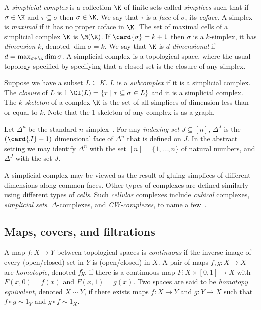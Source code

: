 A \emph{simplicial complex} is a collection $\K$ of finite sets called
\emph{simplices} such that if $\sigma \in \K$ and $\tau \subseteq \sigma$ then 
$\sigma \in \K$. We say that $\tau$ is a \emph{face} of $\sigma$, its \emph{coface}. A simplex
is \emph{maximal} if it has no proper coface in $\K$. The set of maximal cells of a 
simplicial complex $\K$ is $\M(\K)$. If $\card{\sigma} = k+1$
then $\sigma$ is a $k$-simplex, it has \emph{dimension} $k$, denoted 
$\dim{\sigma} = k$. We say that $\K$ is \emph{$d$-dimensional} if 
$d = \max_{\sigma \in \K} \dim{\sigma}$. A simplicial complex is a topological space, where the 
usual topology specified by specifying that a closed set is the closure of any simplex.

Suppose we have a subset $L \subseteq K$.  $L$ is a \emph{subcomplex}
if it is a simplicial complex. The \emph{closure} of $L$ is 1
$\Cl(L) = \{ \tau \mid \tau \subseteq \sigma \in L\}$ and it is a simplicial complex. The 
\emph{$k$-skeleton} of a complex $\K$ is the set of all simplices
of dimension less than or equal to $k$. Note that the 1-skeleton of
any complex is as a graph.

Let $\Delta^n$ be the standard $n$-simplex~\cite{hatcher}. For any
\emph{indexing set} $J \subseteq [n]$, $\Delta^J$ is the $(\card{J}-1)$ 
dimensional face of $\Delta^n$  that is defined on $J$. In the abstract setting we may
identify $\Delta^n$ with the set $[n] = \{1, \ldots, n\}$ of natural numbers, and $\Delta^J$ with the set $J$.

A simplicial complex may be viewed as the result of gluing simplices of 
different dimensions along common faces. Other types of complexes are defined 
similarly using different types of \emph{cells}. Such \emph{cellular} complexes include \emph{cubical} complexes, \emph{simplicial sets}. $\Delta$-complexes, and \emph{CW-complexes}, 
to name a few~\cite{ez-ssc-50,hatcher,kmm-ch-04,m-soat-68}. 

\subsection{Maps, covers, and filtrations}
A map $f: X \rightarrow Y$ between topological spaces is \emph{continuous} if the inverse image of every (open/closed) set in $Y$ is (open/closed) in $X$. A pair of maps $f,g: X \rightarrow X$ are \emph{homotopic}, denoted $f \tilde g$, if there is a continuous map $F: X \times [0,1] \rightarrow X$ with $F(x,0) = f(x)$ and $F(x,1) = g(x)$. Two spaces are said to be \emph{homotopy equivalent}, denoted $X \sim Y$, if there exists maps $f: X \rightarrow Y$ and $g: Y \rightarrow X$ such that $f \circ g \sim 1_Y$ and $g \circ f \sim 1_X$.

